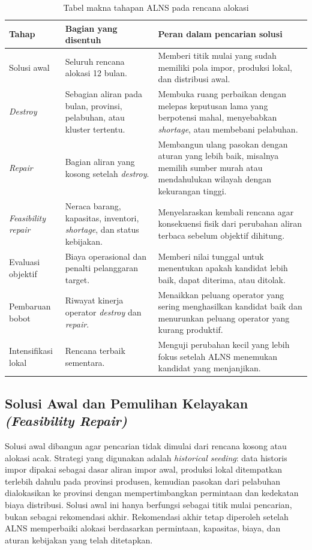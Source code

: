 \documentclass{file/TA-ITS}
\theoremstyle{definition}
\theoremstyle{definition}
\theoremstyle{plain}
\begin{document}
\begin{table}[H]
\centering
\caption{Tabel makna tahapan ALNS pada rencana alokasi}
\label{tab:alns_interaction_concept}
\small
\begin{tabularx}{\textwidth}{@{}p{}p{}X@{}}
\toprule
\textbf{Tahap} & \textbf{Bagian yang disentuh} & \textbf{Peran dalam pencarian solusi} \\
\midrule
Solusi awal & Seluruh rencana alokasi 12 bulan. & Memberi titik mulai yang sudah memiliki pola impor, produksi lokal, dan distribusi awal. \\
\textit{Destroy} & Sebagian aliran pada bulan, provinsi, pelabuhan, atau kluster tertentu. & Membuka ruang perbaikan dengan melepas keputusan lama yang berpotensi mahal, menyebabkan \textit{shortage}, atau membebani pelabuhan. \\
\textit{Repair} & Bagian aliran yang kosong setelah \textit{destroy}. & Membangun ulang pasokan dengan aturan yang lebih baik, misalnya memilih sumber murah atau mendahulukan wilayah dengan kekurangan tinggi. \\
\textit{Feasibility repair} & Neraca barang, kapasitas, inventori, \textit{shortage}, dan status kebijakan. & Menyelaraskan kembali rencana agar konsekuensi fisik dari perubahan aliran terbaca sebelum objektif dihitung. \\
Evaluasi objektif & Biaya operasional dan penalti pelanggaran target. & Memberi nilai tunggal untuk menentukan apakah kandidat lebih baik, dapat diterima, atau ditolak. \\
Pembaruan bobot & Riwayat kinerja operator \textit{destroy} dan \textit{repair}. & Menaikkan peluang operator yang sering menghasilkan kandidat baik dan menurunkan peluang operator yang kurang produktif. \\
Intensifikasi lokal & Rencana terbaik sementara. & Menguji perubahan kecil yang lebih fokus setelah ALNS menemukan kandidat yang menjanjikan. \\
\bottomrule
\end{tabularx}
\end{table}

\subsection{Solusi Awal dan Pemulihan Kelayakan \textit{(Feasibility Repair)}}

Solusi awal dibangun agar pencarian tidak dimulai dari rencana kosong atau alokasi acak. Strategi yang digunakan adalah \textit{historical seeding}: data historis impor dipakai sebagai dasar aliran impor awal, produksi lokal ditempatkan terlebih dahulu pada provinsi produsen, kemudian pasokan dari pelabuhan dialokasikan ke provinsi dengan mempertimbangkan permintaan dan kedekatan biaya distribusi. Solusi awal ini hanya berfungsi sebagai titik mulai pencarian, bukan sebagai rekomendasi akhir. Rekomendasi akhir tetap diperoleh setelah ALNS memperbaiki alokasi berdasarkan permintaan, kapasitas, biaya, dan aturan kebijakan yang telah ditetapkan.
\end{document}
